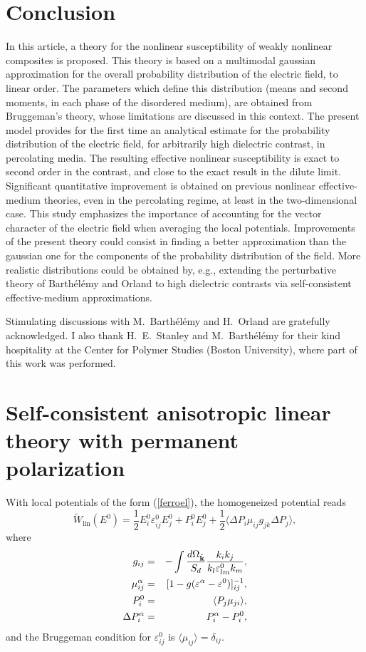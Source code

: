 \section{Conclusion}
\label{c}
In this article, a theory for the nonlinear susceptibility of
weakly nonlinear composites is proposed. This theory is based
on a multimodal gaussian approximation for the overall
probability distribution of the electric field, to linear
order. The parameters which define this distribution (means
and second moments, in each phase of the disordered medium),
are obtained from Bruggeman's theory, whose limitations are
discussed in this context. The present model provides for the
first time an analytical estimate for the probability distribution
of the electric field, for arbitrarily high dielectric contrast,
in percolating media. The resulting effective nonlinear susceptibility
is exact to second order in the contrast, and close to the exact result
in the dilute limit. Significant quantitative improvement is obtained
on previous nonlinear effective-medium theories, even in the percolating
regime, at least in the two-dimensional case. This study emphasizes the
importance of accounting for the vector character of the electric field 
when averaging the local potentials. Improvements of the present theory
could consist in finding a better approximation than the gaussian one
for the components of the probability distribution of the field. More
realistic distributions could be obtained by, e.g., extending the
perturbative theory of Barth\'{e}l\'{e}my and Orland \cite{BART97} to high
dielectric contrasts via self-consistent effective-medium approximations.

\acknowledgements
Stimulating discussions with M.\ Barth\'{e}l\'{e}my and H.\ Orland are gratefully
acknowledged. I also thank H.\ E.\ Stanley and M.\ Barth\'{e}l\'{e}my for their
kind hospitality at the Center for Polymer Studies (Boston University),
where part of this work was performed.
\appendix

\section{Self-consistent anisotropic linear theory with permanent polarization}
\label{sltwpp}

With local potentials of the form (\ref{ferroel}), the homogeneized
potential reads
\begin{equation}
\label{wlin}
\tilde{W}_{\text{lin}}(E^0)=\frac{1}{2}E^0_i \varepsilon^0_{ij}E^0_j
+P^0_i E^0_j +\frac{1}{2}\langle \Delta P_i \mu_{ij} g_{jk} \Delta P_j\rangle,
\end{equation}
where
\begin{eqnarray}
g_{ij}&=&-\int \frac{d\Omega_{\hat{\bf k}}}{S_d} \frac{ k_i k_j}
{k_l \varepsilon^0_{lm} k_m},\\
\mu_{ij}^\alpha&=&[1-g(\varepsilon^\alpha-\varepsilon^0)]^{-1}_{ij},\\
P^0_i&=&\langle P_j\mu_{ji}\rangle,\\
\Delta P_i^\alpha&=&P_i^\alpha-P^0_i,
\end{eqnarray}
and the Bruggeman condition for $\varepsilon^0_{ij}$ is
$\langle \mu_{ij}\rangle=\delta_{ij}$.

